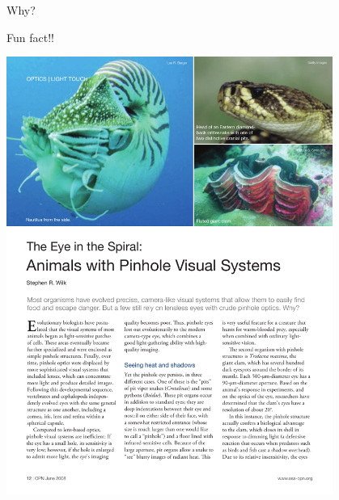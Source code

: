 \begin{frame}{Why?}
  \\
  
\end{frame}

\begin{frame}{Fun fact!!}
  \begin{center}
    \includegraphics[width=0.8\textwidth, trim=0 5in 0 0,clip]{media/animalspinhole.pdf}
  \end{center}
\end{frame}
